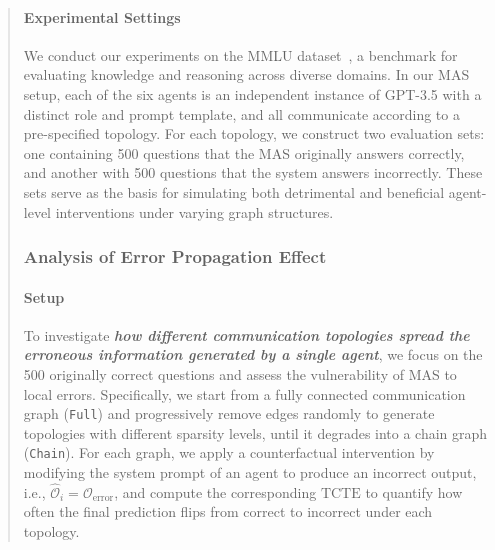 \documentclass[11pt]{article}
\begin{document}
\begin{abstract}
\paragraph{Experimental Settings} 
We conduct our experiments on the MMLU dataset~\cite{hendrycks2020measuring}, a benchmark for evaluating knowledge and reasoning across diverse domains. In our MAS setup, each of the six agents is an independent instance of GPT-3.5 with a distinct role and prompt template, and all communicate according to a pre-specified topology. For each topology, we construct two evaluation sets: one containing 500 questions that the MAS originally answers correctly, and another with 500 questions that the system answers incorrectly. These sets serve as the basis for simulating both detrimental and beneficial agent-level interventions under varying graph structures.

\subsubsection{Analysis of Error Propagation Effect}

\paragraph{Setup} 
To investigate \textbf{\textit{how different communication topologies spread the erroneous information generated by a single agent}}, we focus on the 500 originally correct questions and assess the vulnerability of MAS to local errors. Specifically, we start from a fully connected communication graph (\texttt{Full}) and progressively remove edges randomly to generate topologies with different sparsity levels, until it degrades into a chain graph (\texttt{Chain}). For each graph, we apply a counterfactual intervention by modifying the system prompt of an agent to produce an incorrect output, i.e., $\hat{\mathcal{{O}}}_i = \mathcal{O}_{\text{error}}$, and compute the corresponding $\text{TCTE}$ to quantify how often the final prediction flips from correct to incorrect under each topology. 


\end{abstract}
\end{document}
